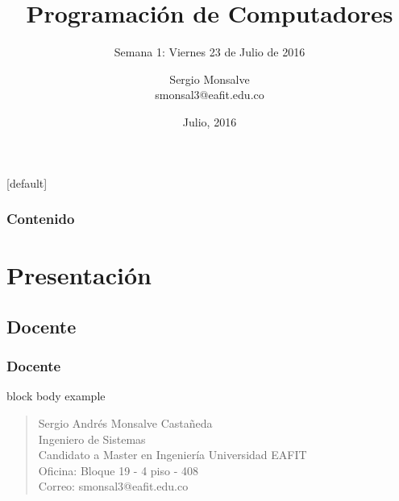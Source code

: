 \documentclass[xcolor=svgnames]{beamer}
\title[ST0240-063]{Programación de Computadores }
\subtitle{Semana 1: Viernes 23 de Julio de 2016}
\author{
  Sergio Monsalve \\
  smonsal3@eafit.edu.co
}
\institute{
  Departamento de Informática y Sistemas \\
  Universidad EAFIT, Medellin, Colombia\\\vspace{0.5cm}
}
\date{Julio, 2016}
\makeatletter
\theoremstyle{example}
\newenvironment{withoutheadline}{
        \setbeamertemplate{headline}[default]
        \def\beamer@entrycode{\vspace*{-\headheight}}
    }{}
\makeatother
\begin{document}
	
\begin{frame}[plain]
	\titlepage
\end{frame}


\begin{withoutheadline}
  \begin{frame}
    \setcounter{tocdepth}{1}
    \frametitle{Contenido}     
    \tableofcontents
  \end{frame}
\end{withoutheadline}

\section{Presentación}

\subsection{Docente}

\begin{frame}
  \frametitle{Docente}
  \begin{beamercolorbox}[wd=\textwidth,rounded=false,shadow=true]
    {block body example}
    \begin{centering}
    \begin{quote}
      Sergio Andrés Monsalve Castañeda \\
      Ingeniero de Sistemas\\
      Candidato a Master en Ingeniería Universidad EAFIT\\
      Oficina: Bloque 19 - 4 piso - 408\\
      Correo: smonsal3@eafit.edu.co %
    \end{quote}
    \end{centering}
  \end{beamercolorbox}
\end{frame}
\end{document}
